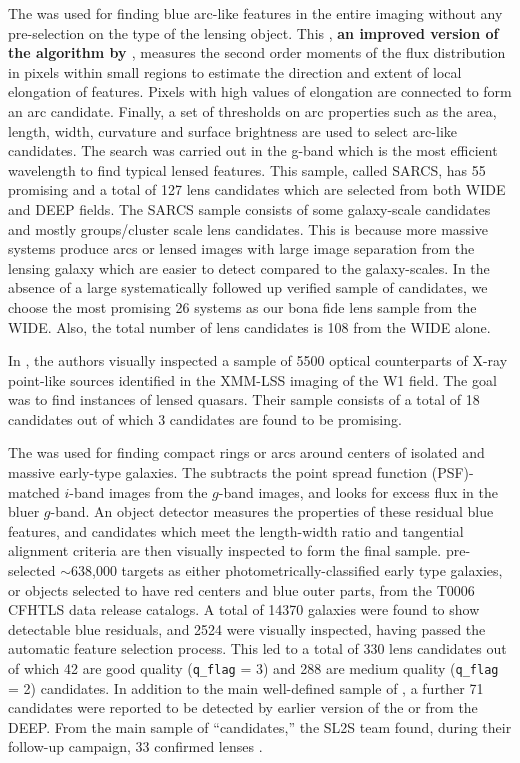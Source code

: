 \documentclass[useAMS,usenatbib,a4paper]{mn2e}
\begin{document}
The \af \citep{More2012} was used for finding blue arc-like features in
the entire \cfhtls imaging without any pre-selection on the type of the lensing
object. This \af, {\bf an improved version of the algorithm by
\citet{Alard2006}}, measures the second order moments of the flux distribution
in pixels within small regions to estimate the direction and extent of local
elongation of features. Pixels with high values of elongation are connected to
form an arc candidate. Finally, a set of thresholds on arc properties such as
the area, length, width, curvature and surface brightness are used to select
arc-like candidates. The search was carried out in the g-band which is the most
efficient wavelength to find typical lensed features.  This sample, called
SARCS, has 55 promising and a total of 127 lens candidates which are selected
from both \cfhtls WIDE and DEEP fields. The SARCS sample consists of some
galaxy-scale candidates and mostly groups/cluster scale lens candidates. This is
because more massive systems produce arcs or lensed images with large image
separation from the lensing galaxy which are easier to detect compared to the
galaxy-scales. In the absence of a large systematically followed up
verified sample of candidates, we choose the most promising 26 systems
as our bona fide lens sample from the \cfhtls WIDE. Also, the total
number of lens candidates is 108 from the \cfhtls WIDE alone.

In \citet{Elyiv2013}, the authors visually inspected a sample of 5500 optical
counterparts of X-ray point-like sources identified in the XMM-LSS
imaging of the \cfhtls W1 field. The goal was to find instances
of lensed quasars. Their sample consists of a total of 18 candidates out
of which 3 candidates are found to be promising.

The \rf \citep{Gavazzi2014} was used for finding compact rings or arcs
around centers of isolated and massive early-type galaxies. The \rf
subtracts the point spread function (PSF)-matched $i$-band images from the $g$-band images, and
looks for excess flux in the bluer $g$-band. An object detector measures
the properties of these residual blue features, and candidates which
meet the length-width ratio and tangential alignment criteria are then
visually inspected to form the final sample. \citet{Gavazzi2014}
pre-selected $\sim$638,000 targets as either photometrically-classified
early type galaxies, or objects selected to have red centers and blue
outer parts, from the T0006 CFHTLS data release catalogs. A total of
14370 galaxies were found to show detectable blue residuals, and 2524
were visually inspected, having passed the automatic feature selection
process. This led to a total of 330 lens candidates out of which 42 are
good quality (\texttt{q\_flag} = 3) and 288 are medium quality
(\texttt{q\_flag} = 2) candidates. In addition to the main well-defined
sample of \citet{Gavazzi2014}, a further 71 candidates were reported to
be detected by earlier version of the \rf or from the \cfhtls DEEP.
From the main sample of ``\rf candidates,'' the SL2S team found, during
their follow-up campaign, 33 confirmed lenses \citep{Sonnenfeld2013a,Sonnenfeld2013b}.
\end{document}
